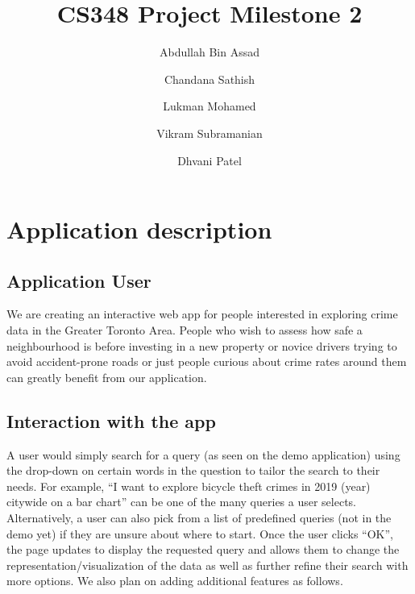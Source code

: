 \documentclass[12pt, a4paper]{article}
\title{CS348 Project Milestone 2}
\author{Abdullah Bin Assad\and Chandana Sathish \and Lukman Mohamed \and Vikram Subramanian \and Dhvani Patel}
\begin{document}
\maketitle

\section*{Application description}
\subsection*{Application User}
We are creating an interactive web app for people interested in exploring crime data in the Greater Toronto Area. People who wish to assess how safe a neighbourhood is before investing in a new property or novice drivers trying to avoid accident-prone roads or just people curious about crime rates around them can greatly benefit from our application.
\subsection*{Interaction with the app}
A user would simply search for a query (as seen on the demo application) using the drop-down on certain words in the question to tailor the search to their needs. For example, “I want to explore bicycle theft crimes in 2019 (year) citywide on a bar chart” can be one of the many queries a user selects. Alternatively, a user can also pick from a list of predefined queries (not in the demo yet) if they are unsure about where to start. Once the user clicks “OK”, the page updates to display the requested query and allows them to change the representation/visualization of the data as well as further refine their search with more options. We also plan on adding additional features as follows.
\end{document}
